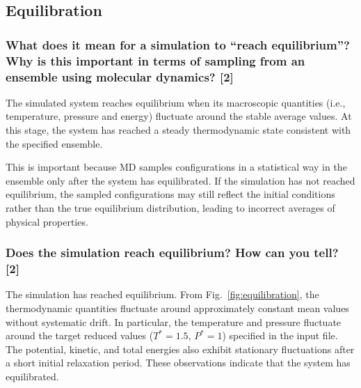 \documentclass[a4paper,10pt,twocolumn]{article}
\begin{document}
\subsection{Equilibration}
\subsubsection*{What does it mean for a simulation to ``reach equilibrium''? Why is this important in terms of sampling from an ensemble using molecular dynamics? [2]}

The simulated system reaches equilibrium when its macroscopic quantities (i.e., temperature, pressure and energy) fluctuate around the stable average values. At this stage, the system has reached a steady thermodynamic state consistent with the specified ensemble.

This is important because MD samples configurations in a statistical way in the ensemble only after the system has equilibrated. If the simulation has not reached equilibrium, the sampled configurations may still reflect the initial conditions rather than the true equilibrium distribution, leading to incorrect averages of physical properties.


\subsubsection*{Does the simulation reach equilibrium? How can you tell? [2] }
The simulation has reached equilibrium. From Fig.~\ref{fig:equilibration}, the thermodynamic quantities fluctuate around approximately constant mean values without systematic drift. In particular, the temperature and pressure fluctuate around the target reduced values ($T^* = 1.5$, $P^* = 1$) specified in the input file. The potential, kinetic, and total energies also exhibit stationary fluctuations after a short initial relaxation period. These observations indicate that the system has equilibrated.
\end{document}

